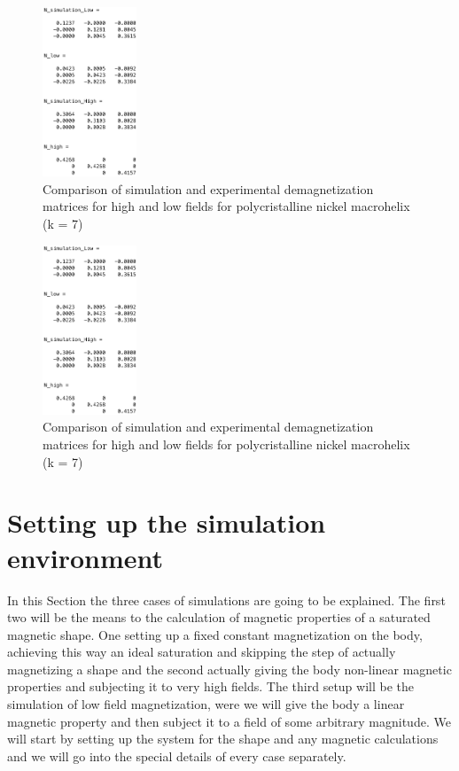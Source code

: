 \begin{figure}[h]
	\centering
  \includegraphics[width=0.25\textwidth]{Pictures/ExperimentalAssessk7N.png}
	\caption{Comparison of simulation and experimental demagnetization matrices for high and low fields for polycristalline nickel macrohelix (k = 7)}
	\label{fig:ExperimentalAssessk7N}
\end{figure}

\begin{figure}[h]
	\centering
  \includegraphics[width=0.25\textwidth]{Pictures/ExperimentalAssessk7N.png}
	\caption{Comparison of simulation and experimental demagnetization matrices for high and low fields for polycristalline nickel macrohelix (k = 7)}
	\label{fig:ExperimentalAssessk7N}
\end{figure}

\clearpage
\section{Setting up the simulation environment}

In this Section the three cases of simulations are going to be explained. The first two will be the means to the calculation of magnetic properties of a saturated magnetic shape. One setting up a fixed constant magnetization on the body, achieving this way an ideal saturation and skipping the step of actually magnetizing a shape and the second actually giving the body non-linear magnetic properties and subjecting it to very high fields. The third setup will be the simulation of low field magnetization, were we will give the body a linear magnetic property and then subject it to a field of some arbitrary magnitude. We will start by setting up the system for the shape and any magnetic calculations and we will go into the special details of every case separately.\\

